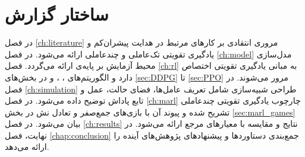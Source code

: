 \section{ساختار گزارش}\label{sec:chapter_content}
در فصل \ref{ch:literature} مروری انتقادی بر کارهای مرتبط در هدایت پیشران‌کم و یادگیری تقویتی تک‌عاملی و چندعاملی ارائه می‌شود.
در فصل \ref{ch:model} مدل‌سازی محیط آزمایش بر پایه‌ی  ارائه می‌گردد.
فصل \ref{ch:rl} به مبانی یادگیری تقویتی اختصاص دارد و الگوریتم‌های ، ،  و  در بخش‌های \ref{sec:DDPG} تا \ref{sec:PPO} مرور می‌شوند.
در فصل \ref{ch:simulation} طراحی شبیه‌سازی شامل تعریف عامل‌ها، فضای حالت، عمل و تابع پاداش توضیح داده می‌شود.
در فصل \ref{ch:marl} چارچوب یادگیری تقویتی چندعاملی تشریح شده و پیوند آن با بازی‌های جمع‌صفر و تعادل نش در بخش \ref{sec:marl_games} بیان می‌شود.
در فصل \ref{ch:results} نتایج و مقایسه با معیارهای مرجع ارائه می‌شود.
در نهایت، فصل \ref{chap:conclusion} جمع‌بندی دستاوردها و پیشنهادهای پژوهش‌های آینده را ارائه می‌دهد.

